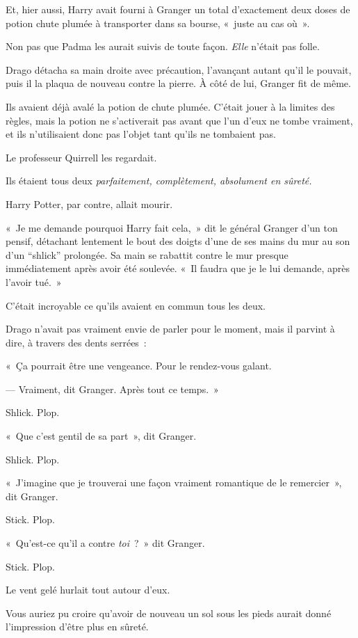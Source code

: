 Et, hier aussi, Harry avait fourni à Granger un total d'exactement deux doses de potion chute plumée à transporter dans sa bourse, «~juste au cas où~».

Non pas que Padma les aurait suivis de toute façon. \emph{Elle} n'était pas folle.

Drago détacha sa main droite avec précaution, l'avançant autant qu'il le pouvait, puis il la plaqua de nouveau contre la pierre. À côté de lui, Granger fit de même.

Ils avaient déjà avalé la potion de chute plumée. C'était jouer à la limites des règles, mais la potion ne s'activerait pas avant que l'un d'eux ne tombe vraiment, et ils n'utilisaient donc pas l'objet tant qu'ils ne tombaient pas.

Le professeur Quirrell les regardait.

Ils étaient tous deux \emph{parfaitement, complètement, absolument en sûreté.}

Harry Potter, par contre, allait mourir.

«~Je me demande pourquoi Harry fait cela,~» dit le général Granger d'un ton pensif, détachant lentement le bout des doigts d'une de ses mains du mur au son d'un “shlick” prolongée. Sa main se rabattit contre le mur presque immédiatement après avoir été soulevée. «~Il faudra que je le lui demande, après l'avoir tué.~»

C'était incroyable ce qu'ils avaient en commun tous les deux.

Drago n'avait pas vraiment envie de parler pour le moment, mais il parvint à dire, à travers des dents serrées~:

«~Ça pourrait être une vengeance. Pour le rendez-vous galant.

--- Vraiment, dit Granger. Après tout ce temps.~»

Shlick. Plop.

«~Que c'est gentil de sa part~», dit Granger.

Shlick. Plop.

«~J'imagine que je trouverai une façon vraiment romantique de le remercier~», dit Granger.

Stick. Plop.

«~Qu'est-ce qu'il a contre \emph{toi}~?~» dit Granger.

Stick. Plop.

Le vent gelé hurlait tout autour d'eux.

\later

Vous auriez pu croire qu'avoir de nouveau un sol sous les pieds aurait donné l'impression d'être plus en sûreté.

